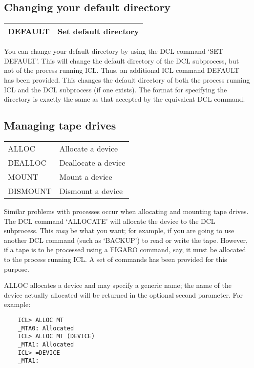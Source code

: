 \subsection{Changing your default directory}

\begin{center}
\begin{tabular}{|l|l|}
\hline
DEFAULT & Set default directory \\
\hline
\end{tabular}
\end{center}

You can change your default directory by using the DCL command `SET DEFAULT'.
This will change the default directory of the DCL subprocess, but not of the
process running ICL.
Thus, an additional ICL command DEFAULT has been provided.
This changes the default directory of both the process running ICL and the DCL
subprocess (if one exists).
The format for specifying the directory is exactly the same as that accepted
by the equivalent DCL command.

\subsection{Managing tape drives}

\begin{center}
\begin{tabular}{|l|l|}
\hline
ALLOC    & Allocate a device\\
DEALLOC  & Deallocate a device\\
MOUNT    & Mount a device\\
DISMOUNT & Dismount a device\\
\hline
\end{tabular}
\end{center}

Similar problems with processes occur when allocating and mounting tape drives.
The DCL command `ALLOCATE' will allocate the device to the DCL subprocess.
This {\em may} be what you want; for example, if you are going to use another
DCL command (such as `BACKUP') to read or write the tape.
However, if a tape is to be processed using a FIGARO command, say, it must be
allocated to the process running ICL.
A set of commands has been provided for this purpose.

ALLOC allocates a device and may specify a generic name; the name of the device
actually allocated will be returned in the optional second parameter.
For example:

\begin{small}
\begin{verbatim}
    ICL> ALLOC MT
    _MTA0: Allocated
    ICL> ALLOC MT (DEVICE)
    _MTA1: Allocated
    ICL> =DEVICE
    _MTA1:
\end{verbatim}
\end{small}

